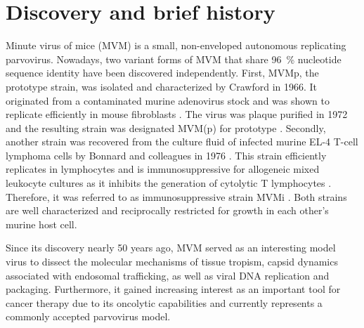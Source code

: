 
\chapter{Discovery and brief history} %

\label{Chapter1} %


\graphicspath{{./Pictures/}}

\label{sec:Discovery and brief history}
Minute virus of mice (MVM) is a small, non-enveloped autonomous replicating parvovirus. Nowadays, two variant forms of MVM that share 96~\% nucleotide sequence identity \cite{pmid3855242} have been discovered independently. 
First, MVMp, the prototype strain, was isolated and characterized by Crawford in 1966. It originated from a contaminated murine adenovirus stock and was shown to replicate efficiently in mouse fibroblasts \cite{pmid5945715}. The virus was plaque purified in 1972 \cite{pmid4673484} and the resulting strain was designated MVM(p) for prototype \cite{MVMp}. Secondly, another strain was recovered from the culture fluid of infected murine EL-4 T-cell lymphoma cells by Bonnard and colleagues in 1976 \cite{pmid1244418}. This strain efficiently replicates in lymphocytes and is immunosuppressive for allogeneic mixed leukocyte cultures as it inhibits the generation of cytolytic T lymphocytes \cite{pmid6457871}. Therefore, it was referred to as immunosuppressive strain MVMi \cite{pmid6264106}. Both strains are well characterized and reciprocally restricted for growth in each other’s murine host cell.  

Since its discovery nearly 50 years ago, MVM served as an interesting model virus to dissect the molecular mechanisms of tissue tropism, capsid dynamics associated with endosomal trafficking, as well as viral DNA replication and packaging. Furthermore, it gained increasing interest as an important tool for cancer therapy due to its oncolytic capabilities and currently represents a commonly accepted parvovirus model.     

